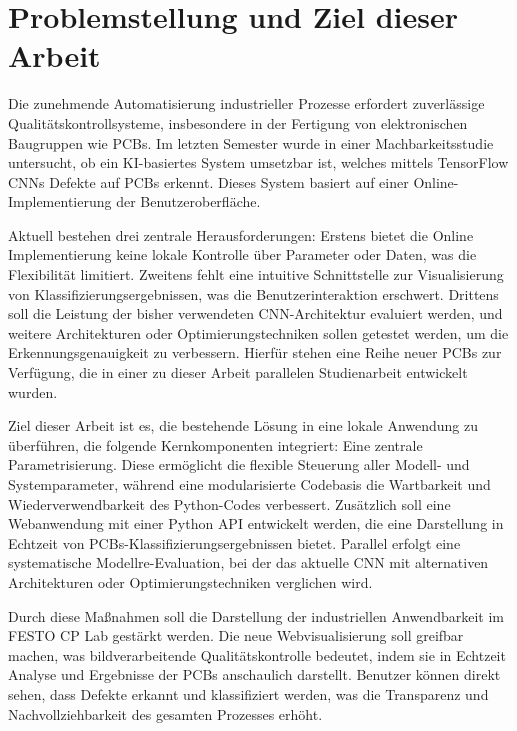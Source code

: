 \chapter{Problemstellung und Ziel dieser Arbeit} \label{chap:problemstellung_und_ziel_dieser_arbeit}

Die zunehmende Automatisierung industrieller Prozesse erfordert zuverlässige Qualitätskontrollsysteme, insbesondere in der Fertigung von elektronischen Baugruppen wie \acp{PCB}. Im letzten Semester wurde in einer Machbarkeitsstudie untersucht, ob ein KI-basiertes System umsetzbar ist, welches mittels TensorFlow \acp{CNN} 
Defekte auf \acp{PCB} erkennt. Dieses System basiert auf einer Online-Implementierung der Benutzeroberfläche. 

Aktuell bestehen drei zentrale Herausforderungen: Erstens bietet die Online Implementierung keine lokale Kontrolle über Parameter oder Daten, was die Flexibilität limitiert. Zweitens fehlt eine intuitive Schnittstelle zur Visualisierung von 
Klassifizierungsergebnissen, was die Benutzerinteraktion erschwert. Drittens soll die Leistung der bisher verwendeten \ac{CNN}-Architektur evaluiert werden, und weitere Architekturen oder Optimierungstechniken sollen getestet werden, um die
Erkennungsgenauigkeit zu verbessern. Hierfür stehen eine Reihe neuer \ac{PCB}s zur Verfügung, die in einer zu dieser Arbeit parallelen Studienarbeit entwickelt wurden.

Ziel dieser Arbeit ist es, die bestehende Lösung in eine lokale Anwendung zu überführen, die folgende Kernkomponenten integriert: Eine zentrale Parametrisierung. Diese ermöglicht die flexible Steuerung aller Modell- und Systemparameter, während eine 
modularisierte Codebasis die Wartbarkeit und Wiederverwendbarkeit des Python-Codes verbessert. Zusätzlich soll eine Webanwendung mit einer Python \ac{API} entwickelt werden, die eine Darstellung in Echtzeit von \acp{PCB}-Klassifizierungsergebnissen bietet. 
Parallel erfolgt eine systematische Modellre-Evaluation, bei der das aktuelle \ac{CNN} mit alternativen Architekturen oder Optimierungstechniken verglichen wird.

Durch diese Maßnahmen soll die Darstellung der industriellen Anwendbarkeit im FESTO CP Lab gestärkt werden. 
Die neue Webvisualisierung soll greifbar machen, was bildverarbeitende Qualitätskontrolle bedeutet, indem sie in Echtzeit Analyse und Ergebnisse der \acp{PCB} anschaulich darstellt. Benutzer können direkt sehen, dass Defekte erkannt und klassifiziert werden, was die Transparenz und Nachvollziehbarkeit des gesamten Prozesses erhöht.